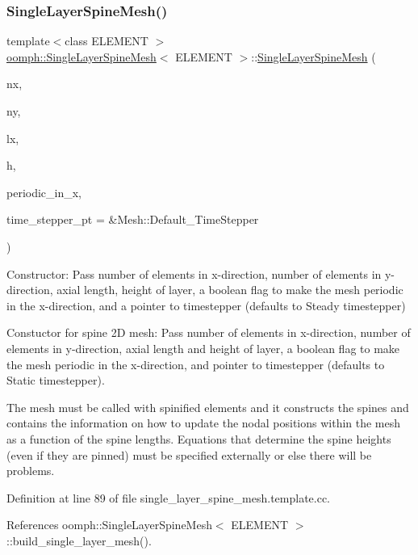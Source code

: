 \subsubsection{\texorpdfstring{Single\+Layer\+Spine\+Mesh()}{SingleLayerSpineMesh()}\hspace{0.1cm}{\footnotesize\ttfamily [2/2]}}
{\footnotesize\ttfamily template$<$class E\+L\+E\+M\+E\+NT $>$ \\
\hyperlink{classoomph_1_1SingleLayerSpineMesh}{oomph\+::\+Single\+Layer\+Spine\+Mesh}$<$ E\+L\+E\+M\+E\+NT $>$\+::\hyperlink{classoomph_1_1SingleLayerSpineMesh}{Single\+Layer\+Spine\+Mesh} (\begin{DoxyParamCaption}\item[{const unsigned \&}]{nx,  }\item[{const unsigned \&}]{ny,  }\item[{const double \&}]{lx,  }\item[{const double \&}]{h,  }\item[{const bool \&}]{periodic\+\_\+in\+\_\+x,  }\item[{Time\+Stepper $\ast$}]{time\+\_\+stepper\+\_\+pt = {\ttfamily \&Mesh\+:\+:Default\+\_\+TimeStepper} }\end{DoxyParamCaption})}



Constructor\+: Pass number of elements in x-\/direction, number of elements in y-\/direction, axial length, height of layer, a boolean flag to make the mesh periodic in the x-\/direction, and a pointer to timestepper (defaults to Steady timestepper) 

Constuctor for spine 2D mesh\+: Pass number of elements in x-\/direction, number of elements in y-\/direction, axial length and height of layer, a boolean flag to make the mesh periodic in the x-\/direction, and pointer to timestepper (defaults to Static timestepper).

The mesh must be called with spinified elements and it constructs the spines and contains the information on how to update the nodal positions within the mesh as a function of the spine lengths. Equations that determine the spine heights (even if they are pinned) must be specified externally or else there will be problems. 

Definition at line 89 of file single\+\_\+layer\+\_\+spine\+\_\+mesh.\+template.\+cc.



References oomph\+::\+Single\+Layer\+Spine\+Mesh$<$ E\+L\+E\+M\+E\+N\+T $>$\+::build\+\_\+single\+\_\+layer\+\_\+mesh().



